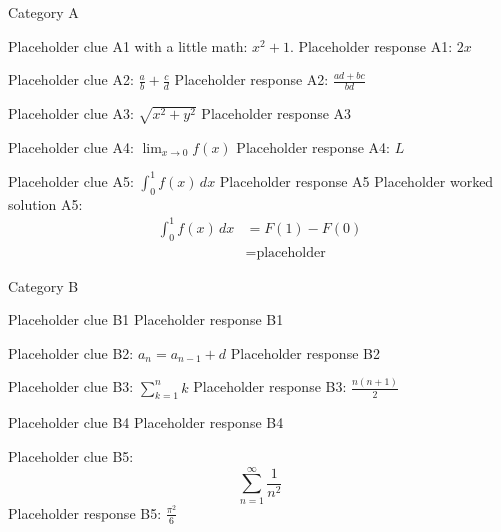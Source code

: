 \documentclass{article}
\begin{document}
\begin{category}{Category A}
  \begin{clue}
    Placeholder clue A1 with a little math: $x^2 + 1$.
  \response
    Placeholder response A1: $2x$
  \end{clue}
  \begin{clue}
    Placeholder clue A2: $\frac{a}{b} + \frac{c}{d}$
  \response
    Placeholder response A2: $\frac{ad + bc}{bd}$
  \end{clue}
  \begin{clue}
    Placeholder clue A3: $\sqrt{x^2 + y^2}$
  \response
    Placeholder response A3
  \end{clue}
  \begin{clue}
    Placeholder clue A4: $\lim_{x \to 0} f(x)$
  \response
    Placeholder response A4: $L$
  \end{clue}
  \begin{clue}
    Placeholder clue A5: $\int_0^1 f(x)\,dx$
  \response
    Placeholder response A5
  \solution
    Placeholder worked solution A5:
    \begin{align*}
      \int_0^1 f(x)\,dx &= F(1) - F(0) \\
                        &= \text{placeholder}
    \end{align*}
  \end{clue}
\end{category}

\begin{category}{Category B}
  \begin{clue}
    Placeholder clue B1
  \response
    Placeholder response B1
  \end{clue}
  \begin{clue}
    Placeholder clue B2: $a_n = a_{n-1} + d$
  \response
    Placeholder response B2
  \end{clue}
  \begin{clue}
    Placeholder clue B3: $\sum_{k=1}^{n} k$
  \response
    Placeholder response B3: $\frac{n(n+1)}{2}$
  \end{clue}
  \begin{clue}
    Placeholder clue B4
  \response
    Placeholder response B4
  \end{clue}
  \begin{clue}
    Placeholder clue B5: \[ \sum_{n=1}^\infty \frac{1}{n^2} \]
  \response
    Placeholder response B5: $\frac{\pi^2}{6}$
  \end{clue}
\end{category}
\end{document}
